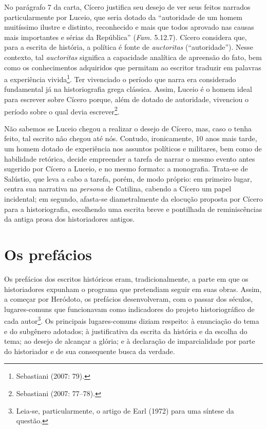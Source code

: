No parágrafo 7 da carta, Cícero justifica seu desejo de ver seus feitos
narrados particularmente por Luceio, que seria dotado da “autoridade de um homem
muitíssimo ilustre e distinto, reconhecido e mais que todos aprovado nas causas
mais importantes e sérias da República” (\emph{Fam.} 5.12.7). Cícero
considera que, para a escrita de história, a política é fonte de
\emph{auctoritas} (``autoridade'').  Nesse contexto, tal \emph{auctoritas}
significa a capacidade analítica de apreensão do fato, bem como os conhecimentos
adquiridos que permitam ao escritor traduzir em palavras a experiência
vivida\footnote{Sebastiani (2007: 79).}. Ter vivenciado o período que narra
era considerado fundamental já na historiografia grega clássica. Assim, Luceio
é o homem ideal para escrever sobre Cícero porque, além de dotado de
autoridade, vivenciou o período sobre o qual devia escrever\footnote{Sebastiani (2007: 77--78).}.



Não sabemos se Luceio chegou a realizar o desejo de Cícero, mas, caso o tenha
feito, tal escrito não chegou até nós. Contudo, ironicamente, 10 anos mais
tarde, um homem dotado de experiência nos assuntos políticos e militares, bem
como de habilidade retórica, decide empreender a tarefa de narrar o mesmo evento antes
sugerido por Cícero a Luceio, e no mesmo formato: a monografia. Trata-se de
Salústio, que leva a cabo a tarefa, porém, de modo próprio: em primeiro lugar,
centra sua narrativa na \emph{persona} de Catilina, cabendo a Cícero um papel
incidental; em segundo, afasta-se diametralmente da elocução proposta por
Cícero para a historiografia, escolhendo uma escrita breve e pontilhada de
reminiscências da antiga prosa dos historiadores antigos.

 
\section{Os prefácios}


Os prefácios dos escritos históricos eram, tradicionalmente, a parte em que os
historiadores expunham o programa que pretendiam seguir em suas obras. Assim, a
começar por Heródoto, os prefácios desenvolveram, com o passar dos séculos,
lugares-comuns que funcionavam como indicadores do projeto historiográfico de
cada autor\footnote{Leia-se, particularmente, o artigo de Earl (1972) para uma
síntese da questão.}. Os principais lugares-comuns diziam respeito: à enunciação do
tema e do subgênero adotados; à justificativa da escrita da história e da
escolha do tema; ao desejo de alcançar a glória; e à declaração de
imparcialidade por parte do historiador e de sua consequente busca da verdade.  

